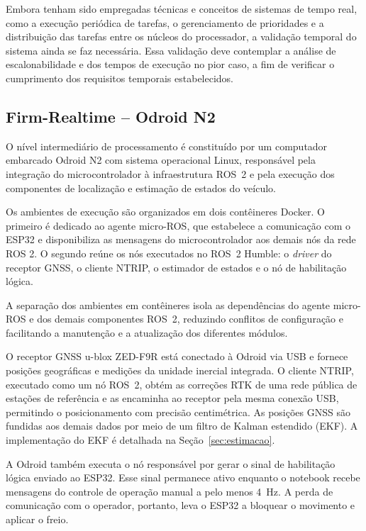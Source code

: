 Embora tenham sido empregadas técnicas e conceitos de sistemas de tempo real, como a execução periódica de tarefas, o gerenciamento de prioridades e a distribuição das tarefas entre os núcleos do processador, a validação temporal do sistema ainda se faz necessária. Essa validação deve contemplar a análise de escalonabilidade e dos tempos de execução no pior caso, a fim de verificar o cumprimento dos requisitos temporais estabelecidos.

\subsection{Firm-Realtime -- Odroid N2}

O nível intermediário de processamento é constituído por um computador embarcado Odroid N2 com sistema operacional Linux, responsável pela integração do microcontrolador à infraestrutura ROS~2 e pela execução dos componentes de localização e estimação de estados do veículo.

Os ambientes de execução são organizados em dois contêineres Docker. O primeiro é dedicado ao agente micro-ROS, que estabelece a comunicação com o ESP32 e disponibiliza as mensagens do microcontrolador aos demais nós da rede ROS 2. O segundo reúne os nós executados no ROS~2 Humble: o \textit{driver} do receptor GNSS, o cliente NTRIP, o estimador de estados e o nó de habilitação lógica.

A separação dos ambientes em contêineres isola as dependências do agente micro-ROS e dos demais componentes ROS~2, reduzindo conflitos de configuração e facilitando a manutenção e a atualização dos diferentes módulos.

O receptor GNSS u-blox ZED-F9R está conectado à Odroid via USB e fornece posições geográficas e medições da unidade inercial integrada. O cliente NTRIP, executado como um nó ROS~2, obtém as correções RTK de uma rede pública de estações de referência e as encaminha ao receptor pela mesma conexão USB, permitindo o posicionamento com precisão centimétrica. As posições GNSS são fundidas aos demais dados por meio de um filtro de Kalman estendido (EKF). A implementação do EKF é detalhada na Seção~\ref{sec:estimacao}.

A Odroid também executa o nó responsável por gerar o sinal de habilitação lógica enviado ao ESP32. Esse sinal permanece ativo enquanto o notebook recebe mensagens do controle de operação manual a pelo menos 4~Hz. A perda de comunicação com o operador, portanto, leva o ESP32 a bloquear o movimento e aplicar o freio.



